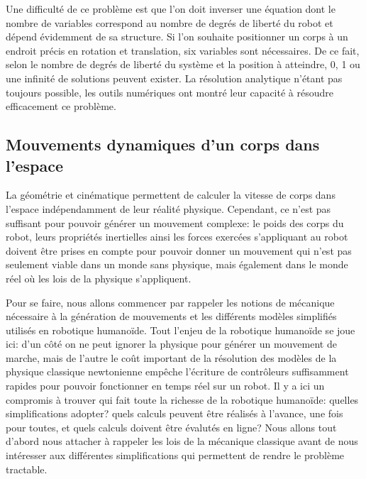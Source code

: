 Une difficulté de ce problème est que l'on doit inverser une équation
dont le nombre de variables correspond au nombre de degrés de liberté
du robot et dépend évidemment de sa structure. Si l'on souhaite
positionner un corps à un endroit précis en rotation et translation,
six variables sont nécessaires. De ce fait, selon le nombre de degrés
de liberté du système et la position à atteindre, 0, 1 ou une infinité
de solutions peuvent exister. La résolution analytique n'étant pas
toujours possible, les outils numériques ont montré leur capacité à
résoudre efficacement ce problème.



\subsection{Mouvements dynamiques d'un corps dans l'espace}

La géométrie et cinématique permettent de calculer la vitesse de corps
dans l'espace indépendamment de leur réalité physique. Cependant, ce
n'est pas suffisant pour pouvoir générer un mouvement complexe: le
poids des corps du robot, leurs propriétés inertielles ainsi les
forces exercées s'appliquant au robot doivent être prises en compte
pour pouvoir donner un mouvement qui n'est pas seulement viable dans
un monde sans physique, mais également dans le monde réel où les lois
de la physique s'appliquent.

Pour se faire, nous allons commencer par rappeler les notions de
mécanique nécessaire à la génération de mouvements et les différents
modèles simplifiés utilisés en robotique humanoïde. Tout l'enjeu de la
robotique humanoïde se joue ici: d'un côté on ne peut ignorer la
physique pour générer un mouvement de marche, mais de l'autre le coût
important de la résolution des modèles de la physique classique
newtonienne empêche l'écriture de contrôleurs suffisamment rapides
pour pouvoir fonctionner en temps réel sur un robot. Il y a ici un
compromis à trouver qui fait toute la richesse de la robotique
humanoïde: quelles simplifications adopter? quels calculs peuvent être
réalisés à l'avance, une fois pour toutes, et quels calculs doivent
être évalutés en ligne? Nous allons tout d'abord nous attacher à rappeler
les lois de la mécanique classique avant de nous intéresser aux
différentes simplifications qui permettent de rendre le problème
tractable.


